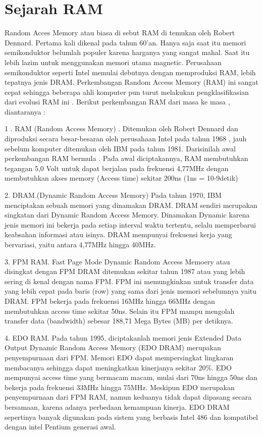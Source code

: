 \section{Sejarah RAM}
Random Acces Memory atau biasa di sebut RAM di temukan oleh Robert Dennard.
Pertama kali dikenal pada tahun 60'an. Hanya saja saat itu memori semikonduktor belumlah populer karena harganya yang sangat mahal. Saat itu lebih lazim untuk menggunakan memori utama magnetic. Perusahaan semikonduktor seperti Intel memulai debutnya dengan memproduksi RAM, lebih tepatnya jenis DRAM.
Perkembangan Random Access Memory (RAM) ini sangat cepat sehingga beberapa ahli komputer pun turut melakukan pengklasifikasian dari evolusi RAM ini . 
Berikut perkembangan RAM dari masa ke masa , diantaranya :

1 . RAM (Random Access Memory) . Ditemukan oleh Robert Dennard dan diproduksi secara besar-besaran oleh perusahaan Intel pada tahun 1968 , 
jauh sebelum komputer ditemukan oleh IBM pada tahun 1981. Darisinilah awal perkembangan RAM bermula . Pada awal diciptakannya, 
RAM membutuhkan tegangan 5,0 Volt untuk dapat berjalan pada frekuensi 4,77MHz dengan membutuhkan akses memory (Access time) sekitar 200ns (1ns = 10-9detik) 

2.	DRAM.(Dynamic Random Access Memory) Pada tahun 1970, IBM menciptakan sebuah memori yang dinamakan DRAM. DRAM sendiri merupakan singkatan dari Dynamic Random Access Memory. Dinamakan Dynamic karena jenis memori ini bekerja pada setiap interval waktu tertentu, selalu memperbarui keabsahan informasi atau isinya. DRAM mempunyai frekuensi kerja yang bervariasi, yaitu antara 4,77MHz hingga 40MHz. 

3.	FPM RAM. Fast Page Mode Dynamic Random Access Memoery atau disingkat dengan FPM DRAM ditemukan sekitar tahun 1987 atau yang lebih sering di kenal dengan nama FPM. FPM ini memungkinkan untuk transfer data yang lebih cepat pada baris (row) yang sama dari jenis memori sebelumnya yaitu DRAM. FPM bekerja pada frekuensi 16MHz hingga 66MHz dengan membutuhkan access time sekitar 50ns. Selain itu FPM mampu mengolah transfer data (bandwidth) sebesar 188,71 Mega Bytes (MB) per detiknya.

4.	EDO RAM. Pada tahun 1995, diciptakanlah memori jenis Extended Data Output Dynamic Random Access Memory (EDO DRAM) merupakan penyempurnaan dari FPM. Memori EDO dapat mempersingkat lingkaran membacanya sehingga dapat meningkatkan kinerjanya sekitar 20\%. EDO mempunyai access time yang bermacam macam, mulai dari 70ns hingga 50ns dan bekerja  pada frekuensi 33MHz hingga 75MHz. Meskipun EDO merupakan penyempurnaan dari FPM RAM, namun keduanya tidak dapat dipasang secara bersamaan, karena adanya perbedaan kemampuan kinerja. EDO DRAM sepertinya banyak digunakan pada sistem yang berbasis Intel 486 dan kompatibel dengan intel Pentium generasi awal.